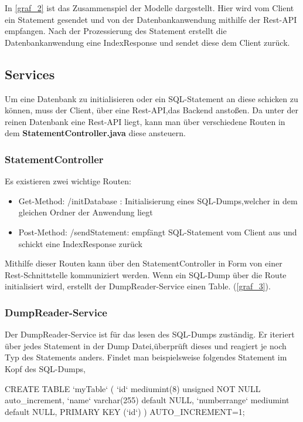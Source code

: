 In \ref{graf_2} ist das Zusammenspiel der Modelle dargestellt. Hier wird vom Client ein Statement gesendet und von der Datenbankanwendung mithilfe der Rest-API empfangen. Nach der Prozessierung des Statement erstellt die Datenbankanwendung eine IndexResponse und sendet diese dem Client zurück.





\subsection{Services}
Um eine Datenbank zu initialisieren oder ein SQL-Statement an diese schicken zu können, muss der Client, über eine Rest-API,das Backend anstoßen.
Da unter der reinen Datenbank eine Rest-API liegt, kann man über verschiedene Routen in dem \textbf{StatementController.java} diese ansteuern.


\subsubsection{StatementController}
Es existieren zwei wichtige Routen:

\begin{itemize}
 \item Get-Method: /initDatabase : Initialisierung eines SQL-Dumps,welcher in dem gleichen Ordner der Anwendung liegt
 \item Post-Method: /sendStatement: empfängt SQL-Statement vom Client aus und schickt eine IndexResponse zurück
\end{itemize}

Mithilfe dieser Routen kann über den StatementController in Form von einer Rest-Schnittstelle kommuniziert werden.
Wenn ein SQL-Dump über die Route initialisiert wird, erstellt der DumpReader-Service einen Table. (\ref{graf_3}). 


\subsubsection{DumpReader-Service}
Der DumpReader-Service ist für das lesen des SQL-Dumps zuständig. Er iteriert über jedes Statement in der Dump Datei,überprüft dieses und reagiert je noch Typ des Statements anders.
Findet man beispielsweise folgendes Statement im Kopf des SQL-Dumps,
\\

\begin{terminalblock}
  \begin{textcode}
CREATE TABLE `myTable` (
  `id` mediumint(8) unsigned NOT NULL auto_increment,
  `name` varchar(255) default NULL,
  `numberrange` mediumint default NULL,
  PRIMARY KEY (`id`)
) AUTO_INCREMENT=1;
  \end{textcode}
\end{terminalblock}

